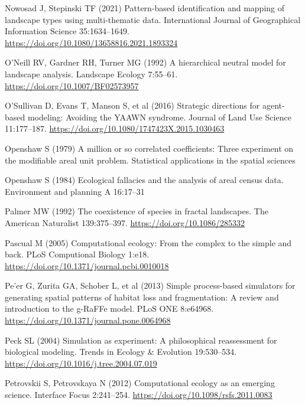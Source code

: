 \documentclass[
  10pt,
  a4paperpaper,
]{article}
\newlength{\cslhangindent}
\newenvironment{CSLReferences}[2] %
 {\begin{list}{}{%
  \setlength{\itemindent}{0pt}
  \setlength{\leftmargin}{0pt}
  \setlength{\parsep}{0pt}
  \ifodd #1
   \setlength{\leftmargin}{\cslhangindent}
   \setlength{\itemindent}{-1\cslhangindent}
  \fi
  \setlength{\itemsep}{#2\baselineskip}}}
 {\end{list}}
\begin{document}
\begin{CSLReferences}{1}{1}
Nowosad J, Stepinski TF (2021) Pattern-based identification and mapping
of landscape types using multi-thematic data. International Journal of
Geographical Information Science 35:1634--1649.
\url{https://doi.org/10.1080/13658816.2021.1893324}

O'Neill RV, Gardner RH, Turner MG (1992) A hierarchical neutral model
for landscape analysis. Landscape Ecology 7:55--61.
\url{https://doi.org/10.1007/BF02573957}

O'Sullivan D, Evans T, Manson S, et al (2016) Strategic directions for
agent-based modeling: Avoiding the YAAWN syndrome. Journal of Land Use
Science 11:177--187. \url{https://doi.org/10.1080/1747423X.2015.1030463}

Openshaw S (1979) A million or so correlated coefficients: Three
experiment on the modifiable areal unit problem. Statistical
applications in the spatial sciences

Openshaw S (1984) Ecological fallacies and the analysis of areal census
data. Environment and planning A 16:17--31

Palmer MW (1992) The coexistence of species in fractal landscapes. The
American Naturalist 139:375--397. \url{https://doi.org/10.1086/285332}

Pascual M (2005) Computational ecology: From the complex to the simple
and back. PLoS Computional Biology 1:e18.
\url{https://doi.org/10.1371/journal.pcbi.0010018}

Pe'er G, Zurita GA, Schober L, et al (2013) Simple process-based
simulators for generating spatial patterns of habitat loss and
fragmentation: A review and introduction to the g-RaFFe model. PLoS ONE
8:e64968. \url{https://doi.org/10.1371/journal.pone.0064968}

Peck SL (2004) Simulation as experiment: A philosophical reassessment
for biological modeling. Trends in Ecology \& Evolution 19:530--534.
\url{https://doi.org/10.1016/j.tree.2004.07.019}

Petrovskii S, Petrovskaya N (2012) Computational ecology as an emerging
science. Interface Focus 2:241--254.
\url{https://doi.org/10.1098/rsfs.2011.0083}


\end{CSLReferences}
\end{document}
